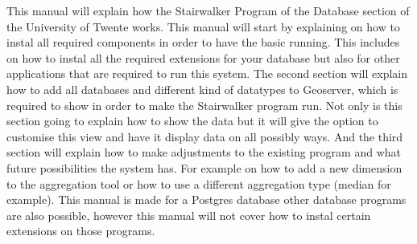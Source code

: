 This manual will explain how the Stairwalker Program of the Database section of the University of Twente works. This manual will start by explaining on how to instal all required components in order to have the basic running. This includes on how to instal all the required extensions for your database but also for other applications that are required to run this system. The second section will explain how to add all databases and different kind of datatypes to Geoserver, which is required to show in order to make the Stairwalker program run. Not only is this section going to explain how to show the data but it will give the option to customise this view and have it display data on all possibly ways. And the third section will explain how to make adjustments to the existing program and what future possibilities the system has. For example on how to add a new dimension to the aggregation tool or how to use a different aggregation type (median for example). This manual is made for a Postgres database other database programs are also possible, however this manual will not cover how to instal certain extensions on those programs.